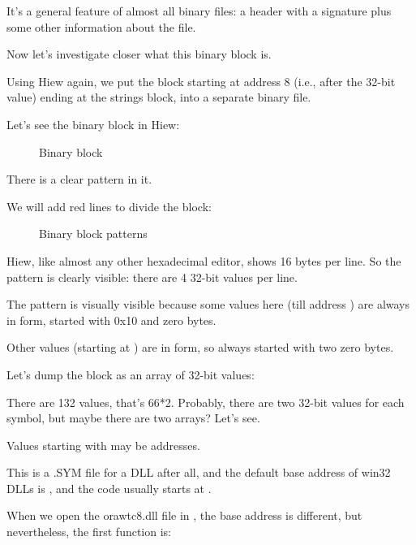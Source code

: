 It's a general feature of almost all binary files: a header with a signature plus some other information 
about the file.

Now let's investigate closer what this binary block is.

Using Hiew again, we put the block starting at address 8 (i.e., after the 32-bit  value) 
ending at the strings block, into a separate binary file.

\clearpage
Let's see the binary block in Hiew:

\begin{figure}[H]
\centering
{}
\caption{Binary block}
\label{fig:oracle_SYM_binary1}
\end{figure}

There is a clear pattern in it. 

\clearpage
We will add red lines to divide the block: 

\begin{figure}[H]
\centering
{}
\caption{Binary block patterns}
\label{fig:oracle_SYM_binary2}
\end{figure}

Hiew, like almost any other hexadecimal editor, shows 16 bytes per line.
So the pattern is clearly visible: 
there are 4 32-bit values per line.

The pattern is visually visible because some values here (till address ) 
are always in  form, 
started with 0x10 and zero bytes.

Other values (starting at ) are in  form, so always started with two zero bytes.

Let's dump the block as an array of 32-bit values:



There are 132 values, that's 66*2.
Probably, there are two 32-bit values for each symbol, but maybe there are two arrays? 
Let's see.

Values starting with  may be addresses.

This is a .SYM file for a DLL after all, and the default base address of
win32 DLLs is , and the code usually starts at .

When we open the orawtc8.dll file in \IDA, the base address is different, but nevertheless, the first function is:

